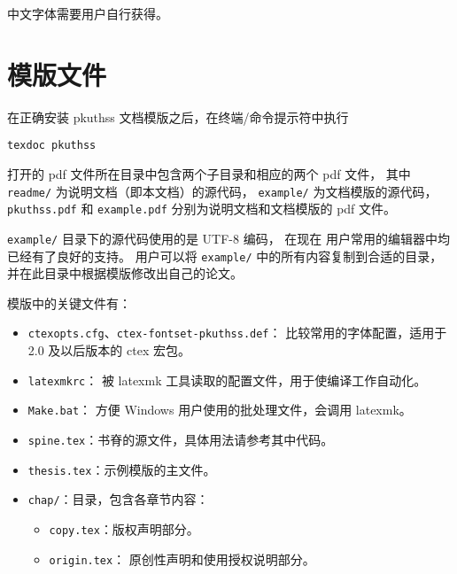 中文字体需要用户自行获得。

\section{模版文件}\label{sec:doc-dir}

在正确安装 pkuthss 文档模版之后，在终端/命令提示符中执行
\begin{Verbatim}
texdoc pkuthss
\end{Verbatim}
打开的 pdf 文件所在目录中包含两个子目录和相应的两个 pdf 文件，
其中 \verb|readme/| 为说明文档（即本文档）的源代码，%
\verb|example/| 为文档模版的源代码，%
\verb|pkuthss.pdf| 和 \verb|example.pdf|
分别为说明文档和文档模版的 pdf 文件。

\verb|example/| 目录下的源代码使用的是 UTF-8 编码，
在现在  用户常用的编辑器中均已经有了良好的支持。
用户可以将 \verb|example/| 中的所有内容复制到合适的目录，
并在此目录中根据模版修改出自己的论文。


模版中的关键文件有：
\begin{itemize}
  \item \verb|ctexopts.cfg|、\verb|ctex-fontset-pkuthss.def|：
    比较常用的字体配置，适用于 2.0 及以后版本的
    ctex 宏包。
  \item \verb|latexmkrc|：
    被 latexmk 工具读取的配置文件，用于使编译工作自动化。
  \item \verb|Make.bat|：%
    方便 Windows 用户使用的批处理文件，会调用 latexmk。
  \item \verb|spine.tex|：书脊的源文件，具体用法请参考其中代码。
  \item \verb|thesis.tex|：示例模版的主文件。

  \item \verb|chap/|：目录，包含各章节内容：
  \begin{itemize}
    \item \verb|copy.tex|：版权声明部分。
    \item \verb|origin.tex|：
      原创性声明和使用授权说明部分。
  \end{itemize}
\end{itemize}

